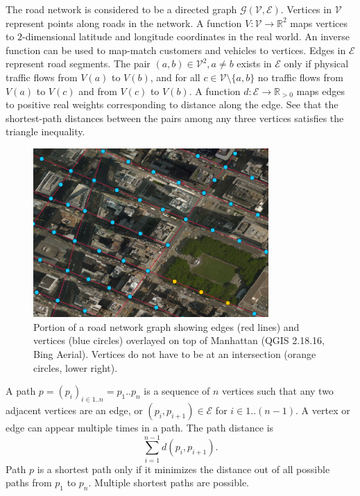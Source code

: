The road network is considered to be a directed graph $\mathcal{G}(\mathcal{V},\mathcal{E})$.
Vertices in $\mathcal{V}$ represent points along roads in the network.
A function ${V:\mathcal{V}\rightarrow \mathbb{R}^2}$ maps vertices to
$2$-dimensional latitude and longitude coordinates in the real world.
An inverse function can be used to map-match customers and vehicles to vertices.
Edges in $\mathcal{E}$ represent road segments. The pair $(a,b)\in
\mathcal{V}^2, a\neq b$ exists in $\mathcal{E}$ only if physical traffic flows from
$V(a)$ to $V(b)$, and for all $c\in \mathcal{V}\setminus\{a,b\}$ no traffic flows from
$V(a)$ to $V(c)$ and from $V(c)$ to $V(b)$.
A function ${d:\mathcal{E}\rightarrow\mathbb{R}_{>0}}$ maps edges to positive real weights
corresponding to distance along the edge. See that the
shortest-path distances between the pairs among any three vertices satisfies the
triangle inequality.

\begin{figure}[h]
\centering
\includegraphics[width=0.8\textwidth]{res/road}
\caption{Portion of a road network graph showing edges (red lines) and vertices
(blue circles) overlayed on top of Manhattan (QGIS 2.18.16, Bing Aerial).
Vertices do not have to be at an intersection (orange circles, lower right).}
\label{fig:road}
\end{figure}

A path $p=(p_i)_{i\in 1..n}=p_1..p_n$ is a sequence of $n$ vertices
such that any two adjacent vertices are an edge, or $(p_i,p_{i+1})\in \mathcal{E}$ for
$i\in 1..(n-1)$.
A vertex or edge can appear multiple times in a path.
The path distance is
$$\sum_{i=1}^{n-1} d(p_i, p_{i+1}).$$
Path $p$ is a shortest path only if it minimizes the distance out of all
possible paths from $p_1$ to $p_n$.
Multiple shortest paths are possible.

